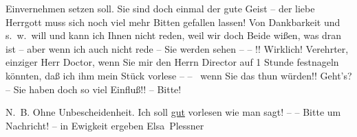                Einvernehmen setzen soll. Sie sind doch einmal der gute Geist – {\pb}der
               liebe Herrgott muss sich noch viel mehr Bitten gefallen lassen! Von Dankbarkeit und
               s. w. will und kann ich Ihnen nicht reden, weil wir doch Beide wißen, was dran ist –
               aber wenn ich auch nicht rede – Sie werden sehen – – !! Wirklich! Verehrter, einziger
               Herr Doctor, wenn Sie mir den Herrn Director auf  1 Stunde
               festnageln könnten, daß ich ihm mein Stück vorlese – –  wenn Sie das thun würden!! Geht's? – Sie
               haben doch so viel Einfluß!! – Bitte!\pend
           
\pstart
           N. B. Ohne Unbescheidenheit. Ich soll \uline{gut}
               vorlesen wie man sagt! – – Bitte um Nachricht! – \label{K_L03705-2v}\label{K_L03705-2} in
               Ewigkeit ergeben\pend
           \pstart \spacefill\mbox{Elsa Plessner}\pend{}\endnumbering{}
\begin{anhang}
\end{anhang}
      